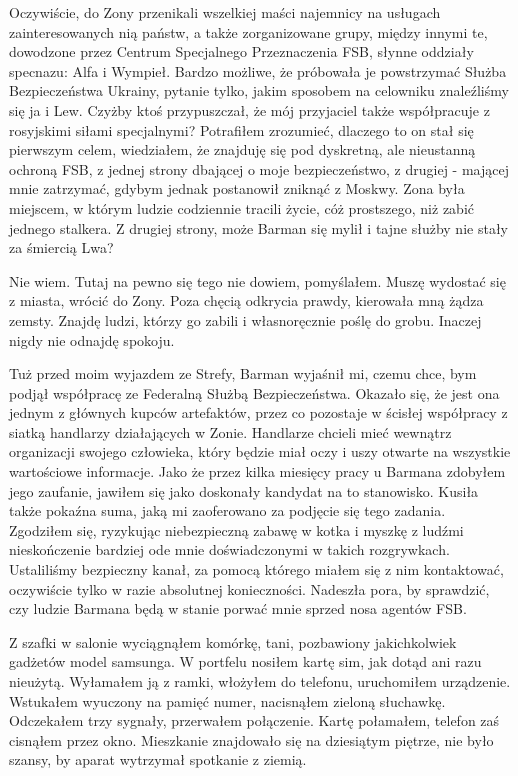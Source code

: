 \documentclass[../MAIN.tex]{subfiles}
\begin{document}
Oczywiście, do Zony przenikali wszelkiej maści najemnicy na
usługach zainteresowanych nią państw, a także zorganizowane
grupy, między innymi te, dowodzone przez Centrum Specjalnego
Przeznaczenia FSB, słynne oddziały specnazu: Alfa i Wympieł.
Bardzo możliwe, że próbowała je powstrzymać Służba
Bezpieczeństwa Ukrainy, pytanie tylko, jakim sposobem na
celowniku znaleźliśmy się ja i Lew. Czyżby ktoś przypuszczał,
że mój przyjaciel także współpracuje z rosyjskimi siłami
specjalnymi? Potrafiłem zrozumieć, dlaczego to on stał się
pierwszym celem, wiedziałem, że znajduję się pod dyskretną, ale
nieustanną ochroną FSB, z jednej strony dbającej o moje
bezpieczeństwo, z drugiej - mającej mnie zatrzymać, gdybym
jednak postanowił zniknąć z Moskwy. Zona była miejscem, w
którym ludzie codziennie tracili życie, cóż prostszego, niż
zabić jednego stalkera. Z drugiej strony, może Barman się mylił
i tajne służby nie stały za śmiercią Lwa?

Nie wiem. Tutaj na pewno się tego nie dowiem, pomyślałem. Muszę
wydostać się z miasta, wrócić do Zony. Poza chęcią odkrycia
prawdy, kierowała mną żądza zemsty. Znajdę ludzi, którzy go
zabili i własnoręcznie poślę do grobu. Inaczej nigdy nie
odnajdę spokoju.

Tuż przed moim wyjazdem ze Strefy, Barman wyjaśnił mi, czemu
chce, bym podjął współpracę ze Federalną Służbą Bezpieczeństwa.
Okazało się, że jest ona jednym z głównych kupców artefaktów,
przez co pozostaje w ścisłej współpracy z siatką handlarzy
działających w Zonie. Handlarze chcieli mieć wewnątrz
organizacji swojego człowieka, który będzie miał oczy i uszy
otwarte na wszystkie wartościowe informacje. Jako że przez
kilka miesięcy pracy u Barmana zdobyłem jego zaufanie, jawiłem
się jako doskonały kandydat na to stanowisko. Kusiła także
pokaźna suma, jaką mi zaoferowano za podjęcie się tego zadania.
Zgodziłem się, ryzykując niebezpieczną zabawę w kotka i myszkę
z ludźmi nieskończenie bardziej ode mnie doświadczonymi w
takich rozgrywkach. Ustaliliśmy bezpieczny kanał, za pomocą
którego miałem się z nim kontaktować, oczywiście tylko w razie
absolutnej konieczności. Nadeszła pora, by sprawdzić, czy
ludzie Barmana będą w stanie porwać mnie sprzed nosa agentów
FSB.

Z szafki w salonie wyciągnąłem komórkę, tani, pozbawiony
jakichkolwiek gadżetów model samsunga. W portfelu nosiłem kartę
sim, jak dotąd ani razu nieużytą. Wyłamałem ją z ramki,
włożyłem do telefonu, uruchomiłem urządzenie. Wstukałem
wyuczony na pamięć numer, nacisnąłem zieloną słuchawkę.
Odczekałem trzy sygnały, przerwałem połączenie. Kartę
połamałem, telefon zaś cisnąłem przez okno. Mieszkanie
znajdowało się na dziesiątym piętrze, nie było szansy, by
aparat wytrzymał spotkanie z ziemią.
\end{document}
